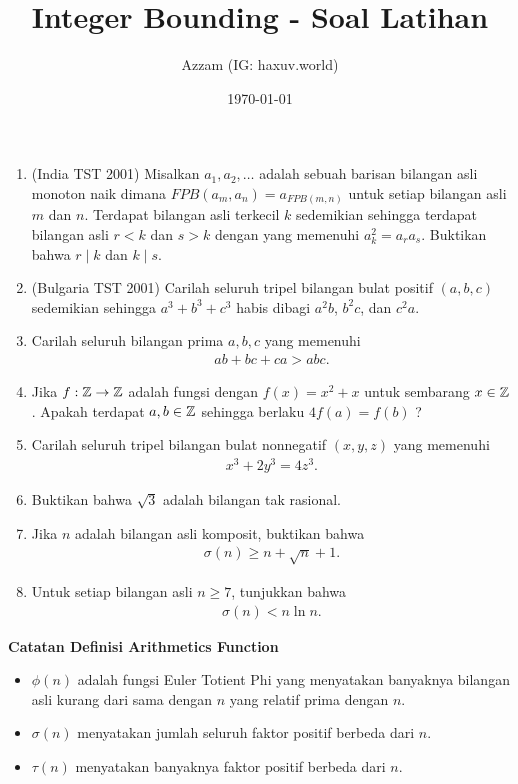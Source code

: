 \documentclass[11pt]{scrartcl}
\title{Integer Bounding - Soal Latihan}
\author{Azzam (IG: haxuv.world)}
\date{\today}
\begin{document}
\maketitle
\begin{enumerate}
    \item (India TST 2001) Misalkan $a_1,a_2,\dots$ adalah sebuah barisan bilangan asli monoton naik dimana $FPB(a_m,a_n)=a_{FPB(m,n)}$ untuk setiap bilangan asli $m$ dan $n$. Terdapat bilangan asli terkecil $k$ sedemikian sehingga terdapat bilangan asli $r<k$ dan $s>k$ dengan yang memenuhi $a_k^2=a_ra_s$. Buktikan bahwa $r \mid k$ dan $k \mid s$.

    \item (Bulgaria TST 2001) Carilah seluruh tripel bilangan bulat positif $(a,b,c)$ sedemikian sehingga $a^3+b^3+c^3$ habis dibagi $a^2b$, $b^2c$, dan $c^2a$.

    \item Carilah seluruh bilangan prima $a,b,c$ yang memenuhi
    \begin{align*}
        ab+bc+ca > abc.
    \end{align*}
    
    \item Jika $f: \mathbb Z \to \mathbb Z$ adalah fungsi dengan $f(x)=x^2+x$ untuk sembarang $x \in \mathbb Z$. Apakah terdapat $a,b \in \mathbb Z$ sehingga berlaku $4f(a)=f(b)$ ?
    
    \item Carilah seluruh tripel bilangan bulat nonnegatif $(x,y,z)$ yang memenuhi
    \begin{align*}
        x^3+2y^3=4z^3.
    \end{align*}

    \item Buktikan bahwa $\sqrt{3}$ adalah bilangan tak rasional.
    
    \item Jika $n$ adalah bilangan asli komposit, buktikan bahwa
    \begin{align*}
        \sigma(n) \ge n + \sqrt{n} + 1.
    \end{align*}

    \item Untuk setiap bilangan asli $n \ge 7$, tunjukkan bahwa
    \begin{align*}
        \sigma(n) < n \ln n.
    \end{align*}
\end{enumerate}

\newpage
\textbf{Catatan Definisi Arithmetics Function}
\begin{itemize}
    \item $\phi(n)$ adalah fungsi Euler Totient Phi yang menyatakan banyaknya bilangan asli kurang dari sama dengan $n$ yang relatif prima dengan $n$.
    \item $\sigma(n)$ menyatakan jumlah seluruh faktor positif berbeda dari $n$.
    \item $\tau(n)$ menyatakan banyaknya faktor positif berbeda dari $n$.
\end{itemize}
\end{document}
